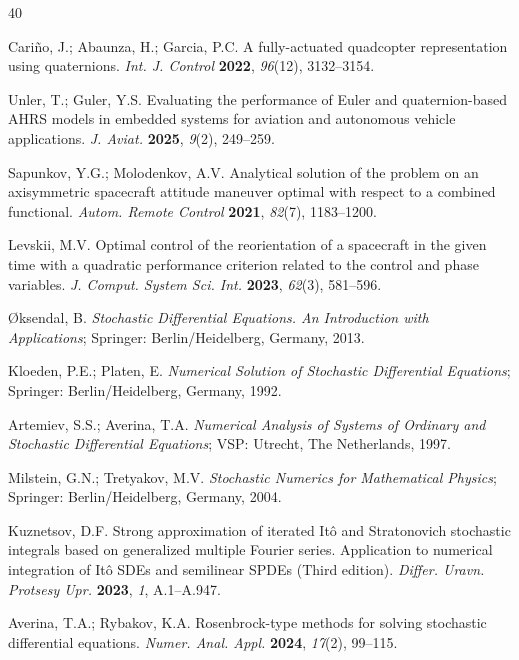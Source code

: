 \documentclass[10pt,reqno]{amsart}
\theoremstyle{plain}
\theoremstyle{remark}
\begin{document}
\begin{thebibliography}{40}

Cari\~{n}o, J.; Abaunza, H.; Garcia, P.C. A fully-actuated quadcopter representation using quaternions. {\em Int. J. Control} {\bf 2022}, {\em 96}(12), 3132--3154. %

Unler, T.; Guler, Y.S. Evaluating the performance of Euler and quaternion-based AHRS models in embedded systems for aviation and autonomous vehicle applications. {\em J. Aviat.} {\bf 2025}, {\em 9}(2), 249--259. %

Sapunkov, Y.G.; Molodenkov, A.V. Analytical solution of the problem on an axisymmetric spacecraft attitude maneuver optimal with respect to a combined functional. {\em Autom. Remote Control} {\bf 2021}, {\em 82}(7), 1183--1200. %

Levskii, M.V. Optimal control of the reorientation of a spacecraft in the given time with a quadratic performance criterion related to the control and phase variables. \emph{J. Comput. System Sci. Int.} {\bf 2023}, {\em 62}(3), 581--596. %

{\O}ksendal, B. {\em Stochastic Differential Equations. An Introduction with Applications}; Springer: Berlin/Heidelberg, Germany, 2013.

Kloeden, P.E.; Platen, E. {\em Numerical Solution of Stochastic Differential Equations}; Springer: Berlin/Heidelberg, Germany, 1992.

Artemiev, S.S.; Averina, T.A. {\em Numerical Analysis of Systems of Ordinary and Stochastic Differential Equations}; VSP: Utrecht, The Netherlands, 1997.

Milstein, G.N.; Tretyakov, M.V. {\em Stochastic Numerics for Mathematical Physics}; Springer: Berlin/Heidelberg, Germany, 2004.

Kuznetsov, D.F. Strong approximation of iterated It\^{o} and Stratonovich stochastic integrals based on generalized multiple Fourier series. Application to numerical integration of It\^{o} SDEs and semilinear SPDEs (Third edition). {\em Differ. Uravn. Protsesy Upr.} {\bf 2023}, {\em 1}, A.1--A.947.

Averina, T.A.; Rybakov, K.A. Rosenbrock-type methods for solving stochastic differential equations. {\em Numer. Anal. Appl.} {\bf 2024}, {\em 17}(2), 99--115. %


\end{thebibliography}
\end{document}
